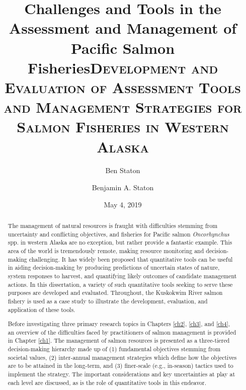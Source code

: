 \documentclass[12pt,]{book}
\title{Challenges and Tools in the Assessment and Management of Pacific Salmon
Fisheries}
\author{Ben Staton}
\date{}
\title{\textsc{Development and Evaluation of Assessment Tools and Management Strategies for Salmon Fisheries in Western Alaska}}
\author{Benjamin A. Staton}
\date{May 4, 2019} %
\theoremstyle{definition}
\theoremstyle{definition}
\theoremstyle{definition}
\theoremstyle{remark}
\begin{document}
\maketitle

\begin{romanpages}      %

\TitlePage 

\doublespacing
\setlength{\parskip}{0pt plus 0pt minus 0pt}

\begin{abstract} 
\noindent
The management of natural resources is fraught with difficulties stemming from uncertainty and conflicting objectives, and fisheries for Pacific salmon \textit{Oncorhynchus} spp. in western Alaska are no exception, but rather provide a fantastic example. This area of the world is tremendously remote, making resource monitoring and decision-making challenging. It has widely been proposed that quantitative tools can be useful in aiding decision-making by producing predictions of uncertain states of nature, system responses to harvest, and quantifying likely outcomes of candidate management actions. In this dissertation, a variety of such quantitative tools seeking to serve these purposes are developed and evaluated. Throughout, the Kuskokwim River salmon fishery is used as a case study to illustrate the development, evaluation, and application of these tools.

Before investigating three primary research topics in Chapters \ref{ch2}, \ref{ch3}, and \ref{ch4}, an overview of the difficulties faced by practitioners of salmon management is provided in Chapter \ref{ch1}. The management of salmon resources is presented as a three-tiered decision-making hierarchy made up of (1) fundamental objectives stemming from societal values, (2) inter-annual management strategies which define how the objectives are to be attained in the long-term, and (3) finer-scale (e.g., in-season) tactics used to implement the strategy. The important considerations and key uncertainties at play at each level are discussed, as is the role of quantitative tools in this endeavor.


\end{abstract}
\end{romanpages}
\end{document}
